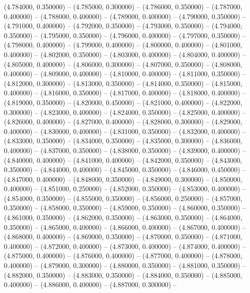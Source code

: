 (4.784000, 0.350000) -- 
(4.785000, 0.300000) -- 
(4.786000, 0.350000) -- 
(4.787000, 0.400000) -- 
(4.788000, 0.400000) -- 
(4.789000, 0.400000) -- 
(4.790000, 0.350000) -- 
(4.791000, 0.400000) -- 
(4.792000, 0.350000) -- 
(4.793000, 0.350000) -- 
(4.794000, 0.350000) -- 
(4.795000, 0.350000) -- 
(4.796000, 0.400000) -- 
(4.797000, 0.350000) -- 
(4.798000, 0.400000) -- 
(4.799000, 0.400000) -- 
(4.800000, 0.400000) -- 
(4.801000, 0.400000) -- 
(4.802000, 0.350000) -- 
(4.803000, 0.400000) -- 
(4.804000, 0.400000) -- 
(4.805000, 0.400000) -- 
(4.806000, 0.300000) -- 
(4.807000, 0.350000) -- 
(4.808000, 0.400000) -- 
(4.809000, 0.400000) -- 
(4.810000, 0.400000) -- 
(4.811000, 0.350000) -- 
(4.812000, 0.300000) -- 
(4.813000, 0.350000) -- 
(4.814000, 0.350000) -- 
(4.815000, 0.400000) -- 
(4.816000, 0.350000) -- 
(4.817000, 0.400000) -- 
(4.818000, 0.400000) -- 
(4.819000, 0.350000) -- 
(4.820000, 0.450000) -- 
(4.821000, 0.400000) -- 
(4.822000, 0.300000) -- 
(4.823000, 0.400000) -- 
(4.824000, 0.350000) -- 
(4.825000, 0.400000) -- 
(4.826000, 0.400000) -- 
(4.827000, 0.400000) -- 
(4.828000, 0.300000) -- 
(4.829000, 0.400000) -- 
(4.830000, 0.400000) -- 
(4.831000, 0.350000) -- 
(4.832000, 0.400000) -- 
(4.833000, 0.350000) -- 
(4.834000, 0.350000) -- 
(4.835000, 0.300000) -- 
(4.836000, 0.400000) -- 
(4.837000, 0.350000) -- 
(4.838000, 0.350000) -- 
(4.839000, 0.400000) -- 
(4.840000, 0.400000) -- 
(4.841000, 0.400000) -- 
(4.842000, 0.350000) -- 
(4.843000, 0.350000) -- 
(4.844000, 0.400000) -- 
(4.845000, 0.350000) -- 
(4.846000, 0.450000) -- 
(4.847000, 0.400000) -- 
(4.848000, 0.350000) -- 
(4.849000, 0.300000) -- 
(4.850000, 0.400000) -- 
(4.851000, 0.250000) -- 
(4.852000, 0.350000) -- 
(4.853000, 0.400000) -- 
(4.854000, 0.350000) -- 
(4.855000, 0.350000) -- 
(4.856000, 0.250000) -- 
(4.857000, 0.350000) -- 
(4.858000, 0.350000) -- 
(4.859000, 0.350000) -- 
(4.860000, 0.350000) -- 
(4.861000, 0.350000) -- 
(4.862000, 0.350000) -- 
(4.863000, 0.350000) -- 
(4.864000, 0.350000) -- 
(4.865000, 0.400000) -- 
(4.866000, 0.400000) -- 
(4.867000, 0.400000) -- 
(4.868000, 0.400000) -- 
(4.869000, 0.350000) -- 
(4.870000, 0.350000) -- 
(4.871000, 0.400000) -- 
(4.872000, 0.400000) -- 
(4.873000, 0.400000) -- 
(4.874000, 0.400000) -- 
(4.875000, 0.400000) -- 
(4.876000, 0.400000) -- 
(4.877000, 0.400000) -- 
(4.878000, 0.400000) -- 
(4.879000, 0.300000) -- 
(4.880000, 0.350000) -- 
(4.881000, 0.350000) -- 
(4.882000, 0.350000) -- 
(4.883000, 0.350000) -- 
(4.884000, 0.350000) -- 
(4.885000, 0.400000) -- 
(4.886000, 0.400000) -- 
(4.887000, 0.300000) -- 
